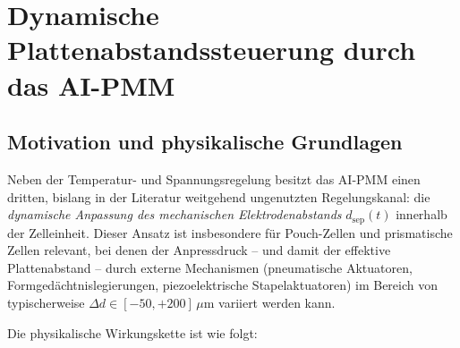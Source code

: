 ﻿\documentclass[12pt,a4paper]{article}
\begin{document}
\section{Dynamische Plattenabstandssteuerung durch das AI-PMM}
\label{sec:plattenabstand}

\subsection{Motivation und physikalische Grundlagen}

Neben der Temperatur- und Spannungsregelung besitzt das AI-PMM einen dritten,
bislang in der Literatur weitgehend ungenutzten Regelungskanal: die \textit{dynamische
Anpassung des mechanischen Elektrodenabstands} $d_\mathrm{sep}(t)$ innerhalb
der Zelleinheit. Dieser Ansatz ist insbesondere für Pouch-Zellen und prismatische
Zellen relevant, bei denen der Anpressdruck -- und damit der effektive Plattenabstand
-- durch externe Mechanismen (pneumatische Aktuatoren, Formgedächtnislegierungen,
piezoelektrische Stapelaktuatoren) im Bereich von typischerweise
$\Delta d \in [-50, +200]\,\mu\mathrm{m}$ variiert werden kann.

Die physikalische Wirkungskette ist wie folgt:
\end{document}
